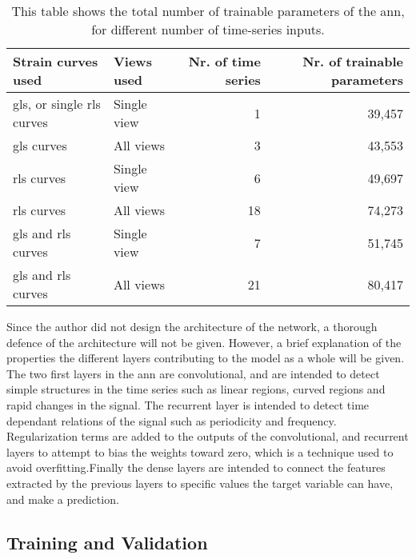 \begin{table*}
    \centering
    \begin{tabular}{ llrr }
        \toprule
        Strain curves used                              & Views used  & Nr. of time series & Nr. of trainable parameters \\
        \midrule                                     
        \acrshort{gls}, or single \acrshort{rls} curves & Single view &         1          & 39,457 \\
        \acrshort{gls} curves                           &  All views  &         3          & 43,553 \\
        \acrshort{rls} curves                           & Single view &         6          & 49,697 \\
        \acrshort{rls} curves                           &  All views  &        18          & 74,273 \\
        \acrshort{gls} and \acrshort{rls} curves        & Single view &         7          & 51,745 \\
        \acrshort{gls} and \acrshort{rls} curves        &  All views  &        21          & 80,417 \\
        \bottomrule
    \end{tabular}
    \caption{This table shows the total number of trainable parameters of the \acrshort{ann}, for different number of time-series inputs.}
    \label{tab:train_params}
\end{table*}

Since the author did not design the architecture of the network, a thorough defence of the architecture will not be given. However, a brief explanation of the properties the different layers contributing to the model as a whole will be given. The two first layers in the \acrshort{ann} are convolutional, and are intended to detect simple structures in the time series such as linear regions, curved regions and rapid changes in the signal. The recurrent layer is intended to detect time dependant relations of the signal such as periodicity and frequency. Regularization terms are added to the outputs of the convolutional, and recurrent layers to attempt to bias the weights toward zero, which is a technique used to avoid overfitting.Finally the dense layers are intended to connect the features extracted by the previous layers to specific values the target variable can have, and make a prediction.

\subsection{Training and Validation}

